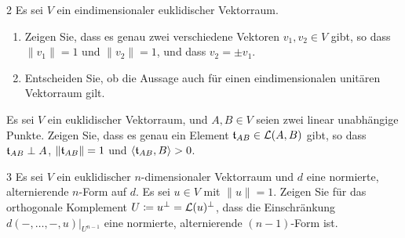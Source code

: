 \begin{question}[subtitle = Zur Existenz und Eindeutigkeit normierter Vektoren auf der Gerade]{2}
  Es sei $V$ ein eindimensionaler euklidischer Vektorraum.
  \begin{enumerate}[leftmargin=*]
    \item
      Zeigen Sie, dass es genau zwei verschiedene Vektoren $v_1, v_2 \in V$ gibt, so dass $\|v_1\| = 1$ und $\|v_2\| = 1$, und dass $v_2 = \pm v_1$.
    \item
      Entscheiden Sie, ob die Aussage auch für einen eindimensionalen unitären Vektorraum gilt.
  \end{enumerate}
\end{question}


\begin{question}[subtitle = Zur Existenz von Tangentialvektoren]{2}
  Es sei $V$ ein euklidischer Vektorraum, und $A, B \in V$ seien zwei linear unabhängige Punkte.
  Zeigen Sie, dass es genau ein Element $\mathfrak{t}_{AB} \in \operatorname{\mathcal{L}}(A,B)$ gibt, so dass $\mathfrak{t}_{AB} \perp A$, $\|\mathfrak{t}_{AB}\| = 1$ und $\left\langle \mathfrak{t}_{AB}, B \right\rangle > 0$.
\end{question}







\begin{question}[subtitle = Einschränkung der Orientierung auf das orthogonale Komplement]{3}
  Es sei $V$ ein euklidischer $n$-dimensionaler Vektorraum und $d$ eine normierte, alternierende $n$-Form auf $d$.
  Es sei $u \in V$ mit $\|u\| = 1$.
  Zeigen Sie für das orthogonale Komplement $U \coloneqq u^\perp = \operatorname{\mathcal{L}}(u)^\perp$, dass die Einschränkung $d(-, \dotsc, -, u)|_{U^{n-1}}$ eine normierte, alternierende $(n-1)$-Form ist.
\end{question}


